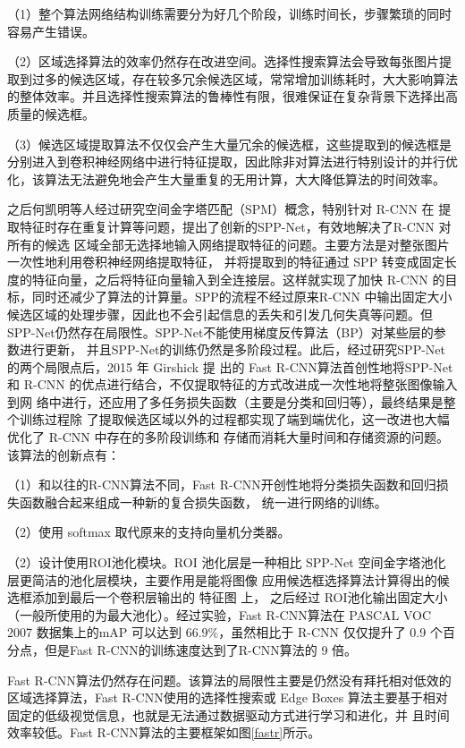 （1）整个算法网络结构训练需要分为好几个阶段，训练时间长，步骤繁琐的同时容易产生错误。

（2）区域选择算法的效率仍然存在改进空间。选择性搜索算法会导致每张图片提取到过多的候选区域，存在较多冗余候选区域，常常增加训练耗时，大大影响算法的整体效率。并且选择性搜索算法的鲁棒性有限，很难保证在复杂背景下选择出高质量的候选框。

（3）候选区域提取算法不仅仅会产生大量冗余的候选框，这些提取到的候选框是分别进入到卷积神经网络中进行特征提取，因此除非对算法进行特别设计的并行优化，该算法无法避免地会产生大量重复的无用计算，大大降低算法的时间效率。

之后何凯明等人经过研究空间金字塔匹配（SPM）概念，特别针对 R-CNN 在
提取特征时存在重复计算等问题，提出了创新的SPP-Net\cite{purkait2017spp}，有效地解决了R-CNN 对所有的候选
区域全部无选择地输入网络提取特征的问题。主要方法是对整张图片一次性地利用卷积神经网络提取特征，
并将提取到的特征通过 SPP 转变成固定长度的特征向量，之后将特征向量输入到全连接层。这样就实现了加快
R-CNN 的目标，同时还减少了算法的计算量。SPP的流程不经过原来R-CNN 中输出固定大小候选区域的处理步骤，因此也不会引起信息的丢失和引发几何失真等问题。但
SPP-Net仍然存在局限性。SPP-Net不能使用梯度反传算法（BP）对某些层的参数进行更新，
并且SPP-Net的训练仍然是多阶段过程。此后，经过研究SPP-Net 的两个局限点后，2015 年 Girshick 提
出的 Fast R-CNN\cite{girshick2015fast}算法首创性地将SPP-Net 和 R-CNN 的优点进行结合，不仅提取特征的方式改进成一次性地将整张图像输入到网
络中进行，还应用了多任务损失函数（主要是分类和回归等），最终结果是整个训练过程除
了提取候选区域以外的过程都实现了端到端优化，这一改进也大幅优化了 R-CNN 中存在的多阶段训练和
存储而消耗大量时间和存储资源的问题。该算法的创新点有：

（1）和以往的R-CNN算法不同，Fast R-CNN开创性地将分类损失函数和回归损失函数融合起来组成一种新的复合损失函数，
统一进行网络的训练。

（2）使用 softmax 取代原来的支持向量机分类器。

（2）设计使用ROI池化模块。ROI
池化层是一种相比 SPP-Net 空间金字塔池化层更简洁的池化层模块，主要作用是能将图像
应用候选框选择算法计算得出的候选框添加到最后一个卷积层输出的 特征图 上，
之后经过 ROI池化输出固定大小（一般所使用的为最大池化）。经过实验，Fast R-CNN算法在
PASCAL VOC 2007 数据集上的mAP 可以达到 $66.9\%$，虽然相比于 R-CNN 仅仅提升了 0.9
个百分点，但是Fast R-CNN的训练速度达到了R-CNN算法的 9 倍。

Fast R-CNN算法仍然存在问题。该算法的局限性主要是仍然没有拜托相对低效的区域选择算法，Fast R-CNN使用的选择性搜索或 Edge Boxes 算法主要基于相对固定的低级视觉信息，也就是无法通过数据驱动方式进行学习和进化，并
且时间效率较低。Fast R-CNN算法的主要框架如图\ref{fastr}所示。

